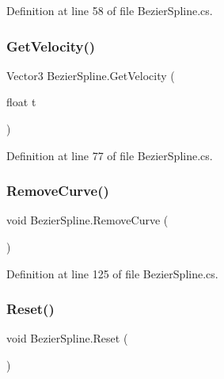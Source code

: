 Definition at line 58 of file Bezier\+Spline.\+cs.

\mbox{\label{class_bezier_spline_a0d8c73af995773501fd3e5c4dac4c3b6}} 
\subsubsection{\texorpdfstring{Get\+Velocity()}{GetVelocity()}}
{\footnotesize\ttfamily Vector3 Bezier\+Spline.\+Get\+Velocity (\begin{DoxyParamCaption}\item[{float}]{t }\end{DoxyParamCaption})}



Definition at line 77 of file Bezier\+Spline.\+cs.

\mbox{\label{class_bezier_spline_ad13eae2643c35fc4e3f2e6e614e616bb}} 
\subsubsection{\texorpdfstring{Remove\+Curve()}{RemoveCurve()}}
{\footnotesize\ttfamily void Bezier\+Spline.\+Remove\+Curve (\begin{DoxyParamCaption}{ }\end{DoxyParamCaption})}



Definition at line 125 of file Bezier\+Spline.\+cs.

\mbox{\label{class_bezier_spline_a69c0d6f430f28fec72bffb8812861247}} 
\subsubsection{\texorpdfstring{Reset()}{Reset()}}
{\footnotesize\ttfamily void Bezier\+Spline.\+Reset (\begin{DoxyParamCaption}{ }\end{DoxyParamCaption})}



